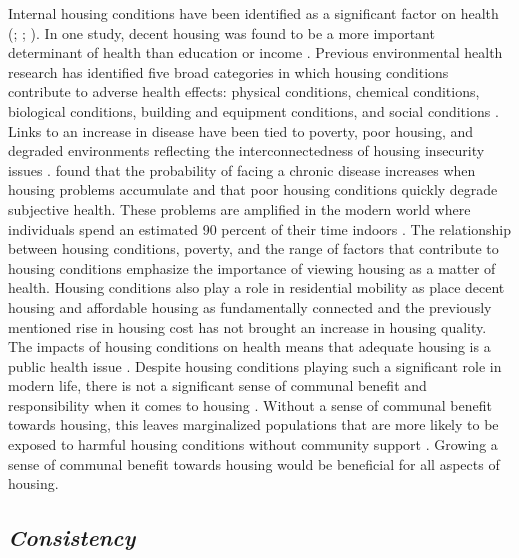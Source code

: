 Internal housing conditions have been identified as a significant factor on health (\citealp{braveman_housing_2011}; \citealp{metzger_fair_2017}; \citealp{swope_housing_2020}). In one study, decent housing was found to be a more important determinant of health than education or income \citep{angel_housing_2014}. Previous environmental health research has identified five broad categories in which housing conditions contribute to adverse health effects: physical conditions, chemical conditions, biological conditions, building and equipment conditions, and social conditions \citep{jacobs_environmental_2011}. Links to an increase in disease have been tied to poverty, poor housing, and degraded environments reflecting the interconnectedness of housing insecurity issues \citep{rauh_housing_2008}. \citet{angel_housing_2014} found that the probability of facing a chronic disease increases when housing problems accumulate and that poor housing conditions quickly degrade subjective health. These problems are amplified in the modern world where individuals spend an estimated 90 percent of their time indoors \citep{palacios_impact_2021}. The relationship between housing conditions, poverty, and the range of factors that contribute to housing conditions emphasize the importance of viewing housing as a matter of health. Housing conditions also play a role in residential mobility as \citet{desmond_housing_2015} place decent housing and affordable housing as fundamentally connected and the previously mentioned rise in housing cost has not brought an increase in housing quality. The impacts of housing conditions on health means that adequate housing is a public health issue \citep{matte_housing_2000}. Despite housing conditions playing such a significant role in modern life, there is not a significant sense of communal benefit and responsibility when it comes to housing \citep{jacobs_environmental_2011}. Without a sense of communal benefit towards housing, this leaves marginalized populations that are more likely to be exposed to harmful housing conditions without community support \citep{swope_housing_2020}. Growing a sense of communal benefit towards housing would be beneficial for all aspects of housing.  

 

\subsection{\textit{Consistency}}  



